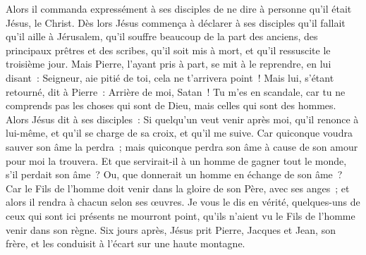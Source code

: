 \begin{multicols}{2}
Alors il commanda expressément à ses disciples de ne dire à personne qu'il était Jésus, le Christ.
Dès lors Jésus commença à déclarer à ses disciples qu'il fallait qu'il aille à Jérusalem, qu'il souffre beaucoup de la part des anciens, des principaux prêtres et des scribes, qu'il soit mis à mort, et qu'il ressuscite le troisième jour.
Mais Pierre, l'ayant pris à part, se mit à le reprendre, en lui disant~: Seigneur, aie pitié de toi, cela ne t'arrivera point~!
Mais lui, s'étant retourné, dit à Pierre~: Arrière de moi, Satan~! Tu m'es en scandale, car tu ne comprends pas les choses qui sont de Dieu, mais celles qui sont des hommes.
Alors Jésus dit à ses disciples~: Si quelqu'un veut venir après moi, qu'il renonce à lui-même, et qu'il se charge de sa croix, et qu'il me suive.
Car quiconque voudra sauver son âme la perdra~; mais quiconque perdra son âme à cause de son amour pour moi la trouvera.
Et que servirait-il à un homme de gagner tout le monde, s'il perdait son âme~? Ou, que donnerait un homme en échange de son âme~?
Car le Fils de l'homme doit venir dans la gloire de son Père, avec ses anges~; et alors il rendra à chacun selon ses œuvres.
Je vous le dis en vérité, quelques-uns de ceux qui sont ici présents ne mourront point, qu'ils n'aient vu le Fils de l'homme venir dans son règne.
\VerseOne{}Six jours après, Jésus prit Pierre, Jacques et Jean, son frère, et les conduisit à l'écart sur une haute montagne.

\end{multicols}
